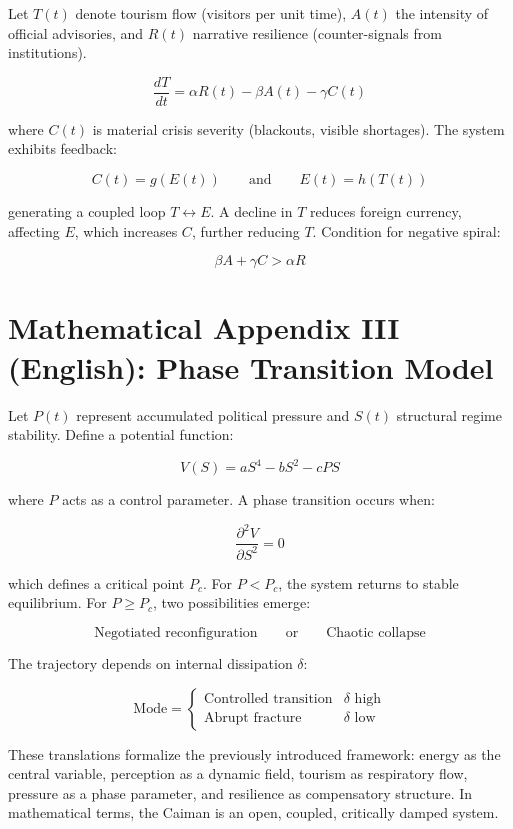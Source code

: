 \documentclass[12pt]{article}
\begin{document}
Let \( T(t) \) denote tourism flow (visitors per unit time), \( A(t) \) the intensity of official advisories, and \( R(t) \) narrative resilience (counter-signals from institutions).

\[
\frac{dT}{dt} = \alpha R(t) - \beta A(t) - \gamma C(t)
\]

where \( C(t) \) is material crisis severity (blackouts, visible shortages). The system exhibits feedback:

\[
C(t) = g(E(t)) \qquad \text{and} \qquad E(t) = h(T(t))
\]

generating a coupled loop \( T \leftrightarrow E \). A decline in \( T \) reduces foreign currency, affecting \( E \), which increases \( C \), further reducing \( T \). Condition for negative spiral:

\[
\beta A + \gamma C > \alpha R
\]

\section{Mathematical Appendix III (English): Phase Transition Model}

Let \( P(t) \) represent accumulated political pressure and \( S(t) \) structural regime stability. Define a potential function:

\[
V(S) = aS^4 - bS^2 - cP S
\]

where \( P \) acts as a control parameter. A phase transition occurs when:

\[
\frac{\partial^2 V}{\partial S^2} = 0
\]

which defines a critical point \( P_c \). For \( P < P_c \), the system returns to stable equilibrium. For \( P \ge P_c \), two possibilities emerge:

\[
\text{Negotiated reconfiguration} \qquad \text{or} \qquad \text{Chaotic collapse}
\]

The trajectory depends on internal dissipation \( \delta \):

\[
\text{Mode} =
\begin{cases}
\text{Controlled transition} & \delta \text{ high} \\
\text{Abrupt fracture} & \delta \text{ low}
\end{cases}
\]

These translations formalize the previously introduced framework: energy as the central variable, perception as a dynamic field, tourism as respiratory flow, pressure as a phase parameter, and resilience as compensatory structure. In mathematical terms, the Caiman is an open, coupled, critically damped system.
\end{document}
